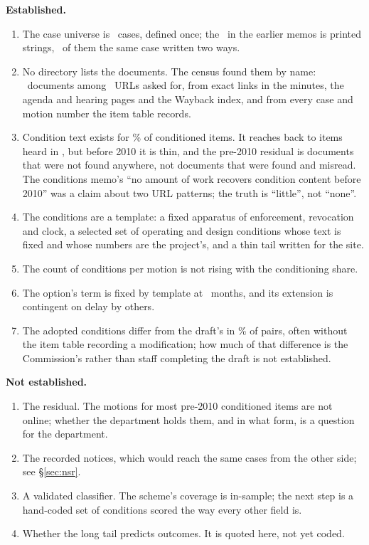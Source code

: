 \documentclass[11pt]{article}
\begin{document}
\textbf{Established.}
\begin{enumerate}
\item The case universe is \ccUniverse\ cases, defined once; the \ccCasesPrinted\ in the
earlier memos is printed strings, \ccCaseMerges\ of them the same case written two ways.
\item No directory lists the documents. The census found them by name: \ccProbeHits\ documents
among \ccProbed\ URLs asked for, from exact links in the minutes, the agenda and hearing pages
and the Wayback index, and from every case and motion number the item table records.
\item Condition text exists for \ccCondWithTextPct\% of conditioned items. It reaches back to
items heard in \ccEarliestItemYear, but before 2010 it is thin, and the pre-2010
residual is documents that were not found anywhere, not documents that were found and misread.
The conditions memo's ``no amount of work recovers condition content before 2010'' was a claim
about two URL patterns; the truth is ``little'', not ``none''.
\item The conditions are a template: a fixed apparatus of enforcement, revocation and clock, a
selected set of operating and design conditions whose text is fixed and whose numbers are the
project's, and a thin tail written for the site.
\item The count of conditions per motion is not rising with the conditioning share.
\item The option's term is fixed by template at \ccValidityModal\ months, and its extension is
contingent on delay by others.
\item The adopted conditions differ from the draft's in \ccDiffAnyChangePct\% of pairs, often
without the item table recording a modification; how much of that difference is the
Commission's rather than staff completing the draft is not established.
\end{enumerate}

\textbf{Not established.}
\begin{enumerate}
\item The residual. The motions for most pre-2010 conditioned items are not online; whether the
department holds them, and in what form, is a question for the department.
\item The recorded notices, which would reach the same cases from the other side; see
\S\ref{sec:nsr}.
\item A validated classifier. The scheme's coverage is in-sample; the next step is a
hand-coded set of conditions scored the way every other field is.
\item Whether the long tail predicts outcomes. It is quoted here, not yet coded.
\end{enumerate}
\end{document}
